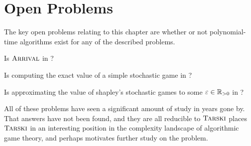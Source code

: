 \section{Open Problems}
The key open problems relating to this chapter are whether or not polynomial-time
algorithms exist for any of the described problems.
\begin{open}
  Is $\textsc{Arrival}$ in \PClass?
\end{open}
\begin{open}
  Is computing the exact value of a simple stochastic game in \PClass?
\end{open}
\begin{open}
  Is approximating the value of shapley's stochastic games to some $\varepsilon \in \mathbb{R}_{> 0}$
  in \PClass?
\end{open}
All of these problems have seen a significant amount of study in years gone by.
That answers have not been found, and they are all reducible to $\textsc{Tarski}$ places
$\textsc{Tarski}$ in an interesting position in the complexity landscape of algorithmic game theory,
and perhaps motivates further study on the problem.
